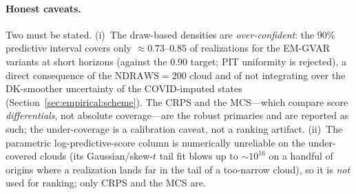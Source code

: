 \documentclass[11pt]{article}
\theoremstyle{definition}
\theoremstyle{remark}
\begin{document}
\paragraph{Honest caveats.} Two must be stated. (i)~The draw-based
densities are \emph{over-confident}: the $90\%$ predictive interval covers
only $\approx 0.73$--$0.85$ of realizations for the EM-GVAR variants at
short horizons (against the $0.90$ target; PIT uniformity is rejected), a
direct consequence of the $\mathrm{NDRAWS}=200$ cloud and of not
integrating over the DK-smoother uncertainty of the COVID-imputed states
(Section~\ref{sec:empirical:scheme}). The CRPS and the MCS---which compare
score \emph{differentials}, not absolute coverage---are the robust
primaries and are reported as such; the under-coverage is a calibration
caveat, not a ranking artifact. (ii)~The parametric log-predictive-score
column is numerically unreliable on the under-covered clouds (its
Gaussian/skew-$t$ tail fit blows up to $\sim\!10^{16}$ on a handful of
origins where a realization lands far in the tail of a too-narrow cloud),
so it is \emph{not} used for ranking; only CRPS and the MCS are.
\end{document}
